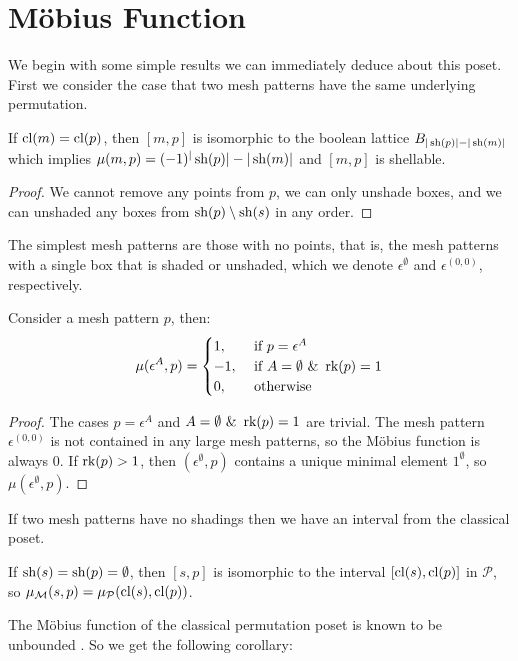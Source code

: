 \documentclass[11pt,a4paper,oneside]{article}
\begin{document}
\section{M\"obius Function}
We begin with some simple results we can immediately deduce about this poset.
First we consider the case that two mesh patterns have the same underlying permutation.

\begin{lem}
If $\operatorname{\textrm{cl}}(m)=\operatorname{\textrm{cl}}(p)$, then $[m,p]$ is isomorphic to the boolean lattice
$B_{|\operatorname{\textrm{sh}}(p)|-|\operatorname{\textrm{sh}}(m)|}$ which implies $\mu(m,p)=(-1)^|\operatorname{\textrm{sh}}(p)|-|\operatorname{\textrm{sh}}(m)|$ and
$[m,p]$ is shellable.
\begin{proof}
We cannot remove any points from $p$, we can only unshade boxes, and we can
unshaded any boxes from $\operatorname{\textrm{sh}}(p)\setminus\operatorname{\textrm{sh}}(s)$ in any order.
\end{proof}
\end{lem}

The simplest mesh patterns are those with no points, that is, the mesh patterns
with a single box that is shaded or unshaded, which we denote
$\epsilon^\emptyset$ and $\epsilon^{(0,0)}$, respectively.

\begin{lem}
Consider a mesh pattern $p$, then:
$$\mu(\epsilon^{A},p)=\begin{cases}
1,&\mbox{ if }p=\epsilon^A \\
-1,&\mbox{ if }A=\emptyset\,\,\&\,\,\operatorname{\textrm{rk}}(p)=1\\
0,&\mbox{ otherwise}
\end{cases}$$
\begin{proof}
The cases $p=\epsilon^A$ and $A=\emptyset\,\,\&\,\,\operatorname{\textrm{rk}}(p)=1$ are trivial. The
mesh pattern $\epsilon^{(0,0)}$ is not contained in any large mesh patterns, so
the M\"obius function is always $0$. If $\operatorname{\textrm{rk}}(p)>1$, then
$(\epsilon^\emptyset,p)$ contains a unique minimal element $1^\emptyset$, so
$\mu(\epsilon^\emptyset,p)$.
\end{proof}
\end{lem}

If two mesh patterns have no shadings then we have an interval from the
classical poset.

\begin{lem}
If $\operatorname{\textrm{sh}}(s)=\operatorname{\textrm{sh}}(p)=\emptyset$, then $[s,p]$ is isomorphic to the interval
$[\operatorname{\textrm{cl}}(s),\operatorname{\textrm{cl}}(p)]$ in $\mathcal{P}$, so $\operatorname{\mu_\mathcal{M}}(s,p)=\operatorname{\mu_\mathcal{P}}(\operatorname{\textrm{cl}}(s),\operatorname{\textrm{cl}}(p))$.
\end{lem}
The M\"obius function of the classical permutation poset is known to be
unbounded \cite{Smith13}. So we get the following corollary:
\end{document}
